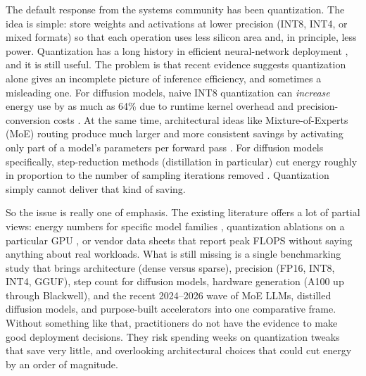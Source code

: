 \documentclass[AMS,STIX2COL]{WileyNJD-v2}
\begin{document}
The default response from the systems community has been quantization. The idea is simple: store weights and activations at lower precision (INT8, INT4, or mixed formats) so that each operation uses less silicon area and, in principle, less power. Quantization has a long history in efficient neural-network deployment \cite{dettmers2022gptint8, frantar2023gptq, lin2024awq}, and it is still useful. The problem is that recent evidence suggests quantization alone gives an incomplete picture of inference efficiency, and sometimes a misleading one. For diffusion models, naive INT8 quantization can \textit{increase} energy use by as much as 64\% due to runtime kernel overhead and precision-conversion costs \cite{huang2024tfmqdm, bertazzini2025hidden}. At the same time, architectural ideas like Mixture-of-Experts (MoE) routing produce much larger and more consistent savings by activating only part of a model's parameters per forward pass \cite{shazeer2017moe, fedus2022switch, lopez2025moe}. For diffusion models specifically, step-reduction methods (distillation in particular) cut energy roughly in proportion to the number of sampling iterations removed \cite{salimans2022progressive, meng2023distillation}. Quantization simply cannot deliver that kind of saving.

So the issue is really one of emphasis. The existing literature offers a lot of partial views: energy numbers for specific model families \cite{samsi2023words, ferreira2025prompts}, quantization ablations on a particular GPU \cite{liu2024survey}, or vendor data sheets that report peak FLOPS without saying anything about real workloads. What is still missing is a single benchmarking study that brings architecture (dense versus sparse), precision (FP16, INT8, INT4, GGUF), step count for diffusion models, hardware generation (A100 up through Blackwell), and the recent 2024--2026 wave of MoE LLMs, distilled diffusion models, and purpose-built accelerators into one comparative frame. Without something like that, practitioners do not have the evidence to make good deployment decisions. They risk spending weeks on quantization tweaks that save very little, and overlooking architectural choices that could cut energy by an order of magnitude.
\end{document}

